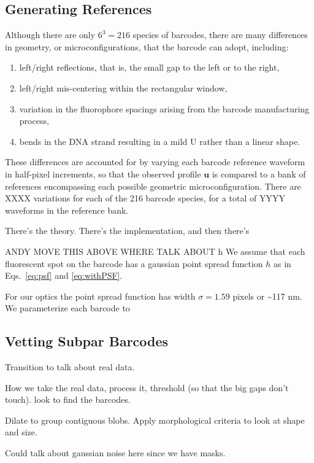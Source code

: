 \subsection{Generating References}\label{sec:generateReferences}
Although there are only $6^3=216$ species of barcodes, there are many differences in geometry, or microconfigurations, that the barcode can adopt, including:
\begin{enumerate}
\item left/right reflections, that is, the small gap to the left or to the right,
\item left/right mis-centering within the rectangular window,
\item variation in the fluorophore spacings arising from the barcode manufacturing process,
\item bends in the DNA strand resulting in a mild U rather than a linear shape.
\end{enumerate}
These differences are accounted for by varying each barcode  reference waveform in half-pixel increments, so that the observed profile $\mathbf{u}$ is compared to a bank of references encompassing each possible geometric microconfiguration. There are XXXX variations for each of the 216 barcode species, for a total of YYYY waveforms in the reference bank.  



There's the theory. There's the implementation, and then there's 


ANDY MOVE THIS ABOVE WHERE TALK ABOUT h
We assume that each fluorescent spot on the barcode has a gaussian point spread function $h$ as in Eqs.~\ref{eq:psf} and \ref{eq:withPSF}. 


For our optics the point spread function has width  $\sigma=1.59$ pixels or \textasciitilde 117 nm. We parameterize each barcode to 

\subsection{Vetting Subpar Barcodes}

Transition to talk about real data.

How we take the real data, process it, threshold (so that the big gaps don't touch). look to find the barcodes.  

Dilate to group contiguous blobs. Apply morphological criteria to look at shape and size.

Could talk about gaussian noise here since we have masks.

